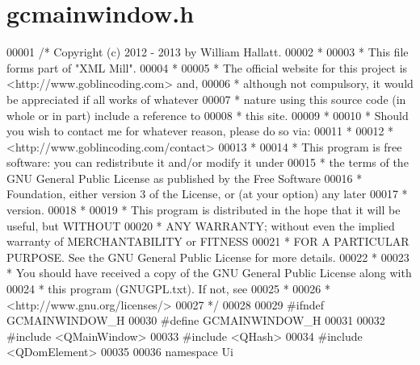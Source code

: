 \hypertarget{gcmainwindow_8h_source}{\section{gcmainwindow.\-h}
}

\begin{DoxyCode}
00001 \textcolor{comment}{/* Copyright (c) 2012 - 2013 by William Hallatt.}
00002 \textcolor{comment}{ *}
00003 \textcolor{comment}{ * This file forms part of "XML Mill".}
00004 \textcolor{comment}{ *}
00005 \textcolor{comment}{ * The official website for this project is <http://www.goblincoding.com> and,}
00006 \textcolor{comment}{ * although not compulsory, it would be appreciated if all works of whatever}
00007 \textcolor{comment}{ * nature using this source code (in whole or in part) include a reference to}
00008 \textcolor{comment}{ * this site.}
00009 \textcolor{comment}{ *}
00010 \textcolor{comment}{ * Should you wish to contact me for whatever reason, please do so via:}
00011 \textcolor{comment}{ *}
00012 \textcolor{comment}{ *                 <http://www.goblincoding.com/contact>}
00013 \textcolor{comment}{ *}
00014 \textcolor{comment}{ * This program is free software: you can redistribute it and/or modify it
       under}
00015 \textcolor{comment}{ * the terms of the GNU General Public License as published by the Free
       Software}
00016 \textcolor{comment}{ * Foundation, either version 3 of the License, or (at your option) any later}
00017 \textcolor{comment}{ * version.}
00018 \textcolor{comment}{ *}
00019 \textcolor{comment}{ * This program is distributed in the hope that it will be useful, but WITHOUT}
00020 \textcolor{comment}{ * ANY WARRANTY; without even the implied warranty of MERCHANTABILITY or
       FITNESS}
00021 \textcolor{comment}{ * FOR A PARTICULAR PURPOSE.  See the GNU General Public License for more
       details.}
00022 \textcolor{comment}{ *}
00023 \textcolor{comment}{ * You should have received a copy of the GNU General Public License along with}
00024 \textcolor{comment}{ * this program (GNUGPL.txt).  If not, see}
00025 \textcolor{comment}{ *}
00026 \textcolor{comment}{ *                    <http://www.gnu.org/licenses/>}
00027 \textcolor{comment}{ */}
00028 
00029 \textcolor{preprocessor}{#ifndef GCMAINWINDOW\_H}
00030 \textcolor{preprocessor}{}\textcolor{preprocessor}{#define GCMAINWINDOW\_H}
00031 \textcolor{preprocessor}{}
00032 \textcolor{preprocessor}{#include <QMainWindow>}
00033 \textcolor{preprocessor}{#include <QHash>}
00034 \textcolor{preprocessor}{#include <QDomElement>}
00035 
00036 \textcolor{keyword}{namespace }Ui

\end{DoxyCode}
